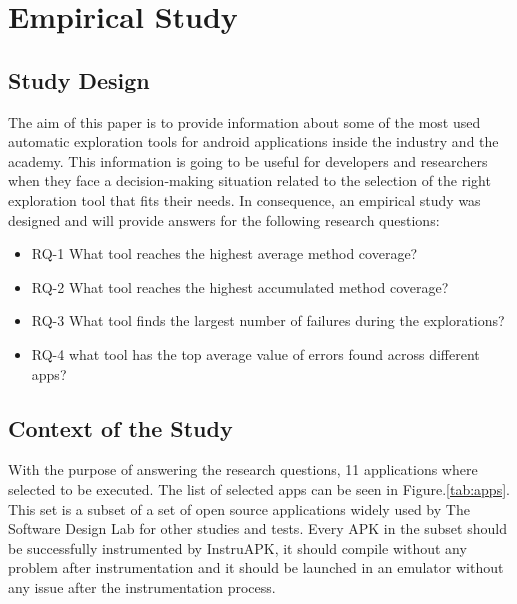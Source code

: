 
\chapter{Empirical Study} %

\label{Chapter4} %

\section{Study Design}\label{sec:studydesign}

The aim of this paper is to provide information about some of the most used automatic exploration tools for android applications inside the industry and the academy. This information is going to be useful for developers and researchers when they face a decision-making situation related to the selection of the right exploration tool that fits their needs. In consequence, an empirical study was designed and will provide answers for the following research questions: 

\begin{itemize}
\item RQ-1 What tool reaches the highest average method coverage?
\item RQ-2 What tool reaches the highest accumulated method coverage?
\item RQ-3 What tool finds the largest number of failures during the explorations?
\item RQ-4 what tool has the top average value of errors found across different apps?
\end{itemize}

\section{Context of the Study}

With the purpose of answering the research questions, 11 applications where selected to be executed. The list of selected apps can be seen in Figure.\ref{tab:apps}. This set is a subset of a set of open source applications widely used by  The Software Design Lab for other studies and tests. Every APK in the subset should be successfully instrumented by InstruAPK, it should compile without any problem after instrumentation and it should be launched in an emulator without any issue after the instrumentation process.

